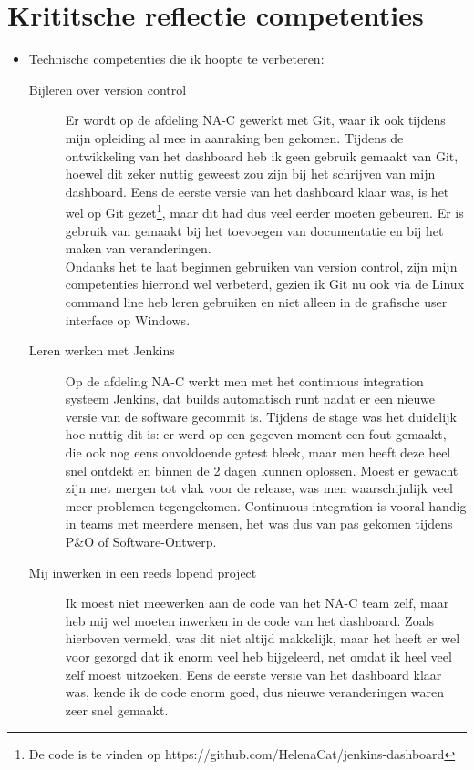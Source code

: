 \documentclass[10pt,a4paper]{article}
\begin{document}
\section{Krititsche reflectie competenties}
\label{reflectie}
\begin{itemize}
\item Technische competenties die ik hoopte te verbeteren:
\begin{description}
\item[Bijleren over version control] Er wordt op de afdeling NA-C gewerkt met Git, waar ik ook tijdens mijn opleiding al mee in aanraking ben gekomen. Tijdens de ontwikkeling van het dashboard heb ik geen gebruik gemaakt van Git, hoewel dit zeker nuttig geweest zou zijn bij het schrijven van mijn dashboard. Eens de eerste versie van het dashboard klaar was, is het wel op Git gezet\footnote{De code is te vinden op https://github.com/HelenaCat/jenkins-dashboard}, maar dit had dus veel eerder moeten gebeuren. Er is gebruik van gemaakt bij het toevoegen van documentatie en bij het maken van veranderingen.\\
Ondanks het te laat beginnen gebruiken van version control, zijn mijn competenties hierrond wel verbeterd, gezien ik Git nu ook via de Linux command line heb leren gebruiken en niet alleen in de grafische user interface op Windows. 
\item[Leren werken met Jenkins] Op de afdeling NA-C werkt men met het continuous integration systeem Jenkins, dat builds automatisch runt nadat er een nieuwe versie van de software gecommit is. Tijdens de stage was het duidelijk hoe nuttig dit is: er werd op een gegeven moment een fout gemaakt, die ook nog eens onvoldoende getest bleek, maar men heeft deze heel snel ontdekt en binnen de 2 dagen kunnen oplossen. Moest er gewacht zijn met mergen tot vlak voor de release, was men waarschijnlijk veel meer problemen tegengekomen. Continuous integration is vooral handig in teams met meerdere mensen, het was dus van pas gekomen tijdens P\&O of Software-Ontwerp. 
\item[Mij inwerken in een reeds lopend project] Ik moest niet meewerken aan de code van het NA-C team zelf, maar heb mij wel moeten inwerken in de code van het dashboard. Zoals hierboven vermeld, was dit niet altijd makkelijk, maar het heeft er wel voor gezorgd dat ik enorm veel heb bijgeleerd, net omdat ik heel veel zelf moest uitzoeken. Eens de eerste versie van het dashboard klaar was, kende ik de code enorm goed, dus nieuwe veranderingen waren zeer snel gemaakt.

\end{description}
\end{itemize}
\end{document}
